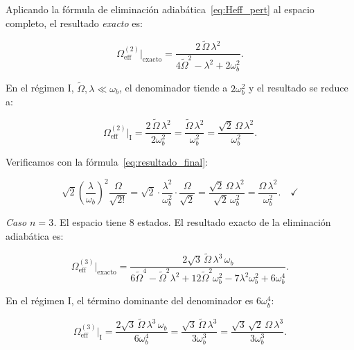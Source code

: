 \documentclass[12pt]{article}
\begin{document}
	Aplicando la f\'ormula de eliminaci\'on adiab\'atica~\eqref{eq:Heff_pert}
	al espacio completo, el resultado \emph{exacto} es:
	
	\begin{equation}
		\Omega_\mathrm{eff}^{(2)}\big|_\mathrm{exacto}
		= \frac{2\,\widetilde\Omega\,\lambda^2}{4\widetilde\Omega^2 - \lambda^2 + 2\omega_b^2}.
	\end{equation}
	
	En el r\'egimen I, $\widetilde\Omega, \lambda \ll \omega_b$, el denominador
	tiende a $2\omega_b^2$ y el resultado se reduce a:
	
	\begin{equation}
		\Omega_\mathrm{eff}^{(2)}\big|_{\mathrm{I}}
		= \frac{2\,\widetilde\Omega\,\lambda^2}{2\omega_b^2}
		= \frac{\widetilde\Omega\,\lambda^2}{\omega_b^2}
		= \frac{\sqrt{2}\,\Omega\,\lambda^2}{\omega_b^2}.
	\end{equation}
	
	Verificamos con la f\'ormula~\eqref{eq:resultado_final}:
	
	\begin{equation}
		\sqrt{2}\left(\frac{\lambda}{\omega_b}\right)^2\frac{\Omega}{\sqrt{2!}}
		= \sqrt{2}\cdot\frac{\lambda^2}{\omega_b^2}\cdot\frac{\Omega}{\sqrt{2}}
		= \frac{\sqrt{2}\,\Omega\,\lambda^2}{\sqrt{2}\,\omega_b^2}
		= \frac{\Omega\,\lambda^2}{\omega_b^2}. \quad\checkmark
	\end{equation}
	
	\medskip
	\noindent
	\textit{Caso $n = 3$.}
	El espacio tiene 8 estados. El resultado exacto de la eliminaci\'on
	adiab\'atica es:
	
	\begin{equation}
		\Omega_\mathrm{eff}^{(3)}\big|_\mathrm{exacto}
		= \frac{2\sqrt{3}\,\widetilde\Omega\,\lambda^3\,\omega_b}
		{6\widetilde\Omega^4 - \widetilde\Omega^2\lambda^2
			+ 12\widetilde\Omega^2\omega_b^2 - 7\lambda^2\omega_b^2 + 6\omega_b^4}.
	\end{equation}
	
	En el r\'egimen I, el t\'ermino dominante del denominador es $6\omega_b^4$:
	
	\begin{equation}
		\Omega_\mathrm{eff}^{(3)}\big|_{\mathrm{I}}
		= \frac{2\sqrt{3}\,\widetilde\Omega\,\lambda^3\,\omega_b}{6\omega_b^4}
		= \frac{\sqrt{3}\,\widetilde\Omega\,\lambda^3}{3\omega_b^3}
		= \frac{\sqrt{3}\,\sqrt{2}\,\Omega\,\lambda^3}{3\omega_b^3}.
	\end{equation}
	
\end{document}

